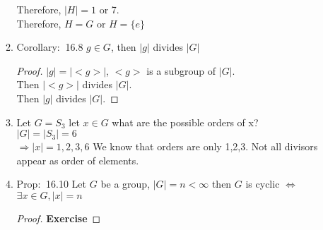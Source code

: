 \documentclass[12pt]{article}
\newcommand{\prop}{{\color{blue} Prop: $\ $}}
\newcommand{\coro}{{\color{blue} Corollary: $\ $}}
\begin{document}
\begin{enumerate}
\begin{enumerate}
        Therefore, $|H| = 1 $ or 7.\\
        Therefore, $H = G$ or $H = \{e\}$
        \item \coro 16.8 $g \in G$, then $|g|$ divides $|G|$
        \begin{proof}
            $|g|=|<g>|$, $<g>$ is a subgroup of $|G|$.\\
            Then $|<g>|$ divides $|G|$.\\
            Then $|g|$ divides $|G|$.
        \end{proof}
        \item Let $G= S_3$ let $x \in G$ what are the possible orders of x?\\
        $|G| = |S_3| = 6$\\
        $\Rightarrow |x| = 1,2,3,6$
        We know that orders are only 1,2,3. Not all divisors appear as order of elements.
        \item \prop 16.10 Let $G$ be a group, $|G| = n < \infty$ then $G$ is cyclic $\Leftrightarrow$ $\exists x \in G, |x| = n$
        \begin{proof}
            \textbf{Exercise}


\end{proof}
\end{enumerate}
\end{enumerate}
\end{document}
